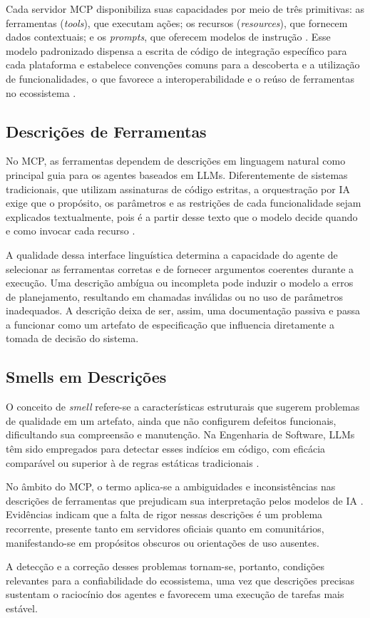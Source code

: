 Cada servidor MCP disponibiliza suas capacidades por meio de três primitivas: as ferramentas (\textit{tools}), que executam ações; os recursos (\textit{resources}), que fornecem dados contextuais; e os \textit{prompts}, que oferecem modelos de instrução \cite{guo2025measurement}. Esse modelo padronizado dispensa a escrita de código de integração específico para cada plataforma e estabelece convenções comuns para a descoberta e a utilização de funcionalidades, o que favorece a interoperabilidade e o reúso de ferramentas no ecossistema \cite{mcpAtFirstGlance}.

\subsection{Descrições de Ferramentas}

No MCP, as ferramentas dependem de descrições em linguagem natural como principal guia para os agentes baseados em LLMs. Diferentemente de sistemas tradicionais, que utilizam assinaturas de código estritas, a orquestração por IA exige que o propósito, os parâmetros e as restrições de cada funcionalidade sejam explicados textualmente, pois é a partir desse texto que o modelo decide quando e como invocar cada recurso \cite{2026arXiv260214878M}.

A qualidade dessa interface linguística determina a capacidade do agente de selecionar as ferramentas corretas e de fornecer argumentos coerentes durante a execução. Uma descrição ambígua ou incompleta pode induzir o modelo a erros de planejamento, resultando em chamadas inválidas ou no uso de parâmetros inadequados. A descrição deixa de ser, assim, uma documentação passiva e passa a funcionar como um artefato de especificação que influencia diretamente a tomada de decisão do sistema.

\subsection{Smells em Descrições}

O conceito de \textit{smell} refere-se a características estruturais que sugerem problemas de qualidade em um artefato, ainda que não configurem defeitos funcionais, dificultando sua compreensão e manutenção. Na Engenharia de Software, LLMs têm sido empregados para detectar esses indícios em código, com eficácia comparável ou superior à de regras estáticas tradicionais \cite{souza2026beyond}.

No âmbito do MCP, o termo aplica-se a ambiguidades e inconsistências nas descrições de ferramentas que prejudicam sua interpretação pelos modelos de IA \cite{2026arXiv260214878M}. Evidências indicam que a falta de rigor nessas descrições é um problema recorrente, presente tanto em servidores oficiais quanto em comunitários, manifestando-se em propósitos obscuros ou orientações de uso ausentes.

A detecção e a correção desses problemas tornam-se, portanto, condições relevantes para a confiabilidade do ecossistema, uma vez que descrições precisas sustentam o raciocínio dos agentes e favorecem uma execução de tarefas mais estável.
